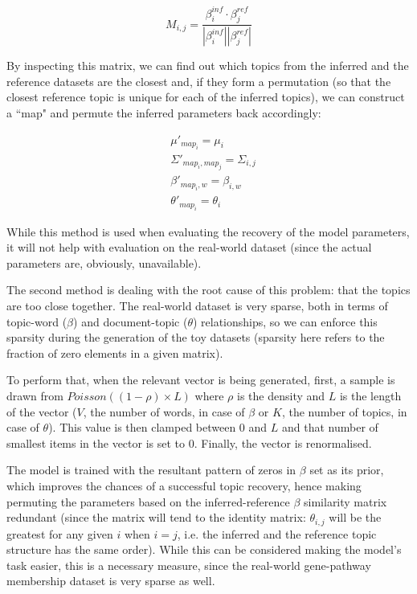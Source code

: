 \documentclass[12pt,a4paper,twoside,openright]{report}
\begin{document}
\begin{equation}\label{eq:beta_similarity matrix}
M_{i,j} = \frac{\beta^{inf}_i \cdot \beta^{ref}_j}{|\beta^{inf}_i||\beta^{ref}_j|}
\end{equation}

By inspecting this matrix, we can find out which topics from the inferred and the reference datasets are the closest and, if they form a permutation (so that the closest reference topic is unique for each of the inferred topics), we can construct a ``map" and permute the inferred parameters back accordingly:

\begin{align*}
&\mu'_{map_i} = \mu_i \\
&\Sigma'_{map_i, map_j} = \Sigma_{i, j} \\
&\beta'_{map_i, w} = \beta_{i, w} \\
&\theta'_{map_i} = \theta_i
\end{align*}

While this method is used when evaluating the recovery of the model parameters, it will not help with evaluation on the real-world dataset (since the actual parameters are, obviously, unavailable).

The second method is dealing with the root cause of this problem: that the topics are too close together. The real-world dataset is very sparse, both in terms of topic-word ($\beta$) and document-topic ($\theta$) relationships, so we can enforce this sparsity during the generation of the toy datasets (sparsity here refers to the fraction of zero elements in a given matrix).

To perform that, when the relevant vector is being generated, first, a sample is drawn from $\mathit{Poisson}((1-\rho) \times L)$ where $\rho$ is the density and $L$ is the length of the vector ($V$, the number of words, in case of $\beta$ or $K$, the number of topics, in case of $\theta$). This value is then clamped between 0 and $L$ and that number of smallest items in the vector is set to 0. Finally, the vector is renormalised.

The model is trained with the resultant pattern of zeros in $\beta$ set as its prior, which improves the chances of a successful topic recovery, hence making permuting the parameters based on the inferred-reference $\beta$ similarity matrix redundant (since the matrix will tend to the identity matrix: $\theta_{i, j}$ will be the greatest for any given $i$ when $i = j$, i.e. the inferred and the reference topic structure has the same order). While this can be considered making the model's task easier, this is a necessary measure, since the real-world gene-pathway membership dataset is very sparse as well.
\end{document}
